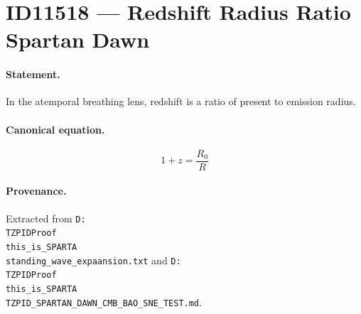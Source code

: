 \section*{ID11518 --- Redshift Radius Ratio Spartan Dawn}

\paragraph{Statement.}
In the atemporal breathing lens, redshift is a ratio of present to emission radius.

\paragraph{Canonical equation.}
\[
1+z=\frac{R_0}{R}
\]

\paragraph{Provenance.}
Extracted from \texttt{D:\\TZPIDProof\\this\_is\_SPARTA\\standing\_wave\_expaansion.txt} and \texttt{D:\\TZPIDProof\\this\_is\_SPARTA\\TZPID\_SPARTAN\_DAWN\_CMB\_BAO\_SNE\_TEST.md}.
